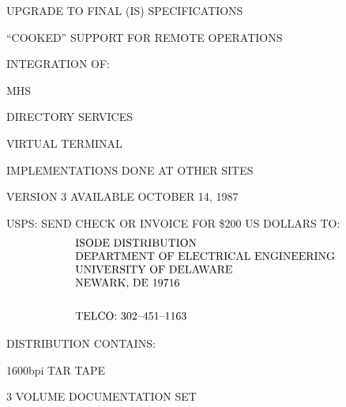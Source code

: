 \begin{bwslide}

\begin{nrtc}
\item	UPGRADE TO FINAL (IS) SPECIFICATIONS

\item	``COOKED'' SUPPORT FOR REMOTE OPERATIONS

\item	INTEGRATION OF:
    \begin{nrtc}
    \item	MHS

    \item	DIRECTORY SERVICES

    \item	VIRTUAL TERMINAL
    \end{nrtc}
	IMPLEMENTATIONS DONE AT OTHER SITES
\end{nrtc}
\end{bwslide}


\begin{bwslide}

\begin{nrtc}
\item	VERSION 3 AVAILABLE OCTOBER 14, 1987

\item	USPS: SEND CHECK OR INVOICE FOR \$200 US DOLLARS TO:
    \[\begin{tabular}{l}
	ISODE DISTRIBUTION\\
	DEPARTMENT OF ELECTRICAL ENGINEERING\\
	UNIVERSITY OF DELAWARE\\
	NEWARK, DE  19716\\[0.25in]
	TELCO: 302--451--1163
    \end{tabular}\]

\item	DISTRIBUTION CONTAINS:
    \begin{nrtc}
    \item	1600bpi TAR TAPE

    \item	3 VOLUME DOCUMENTATION SET
    \end{nrtc}
\end{nrtc}
\end{bwslide}



